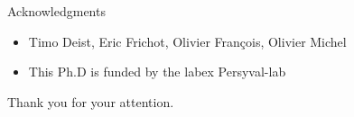 \documentclass{beamer}\usepackage[]{graphicx}\usepackage[]{color}
\begin{document}

\begin{frame}{Acknowledgments}
\begin{itemize}
  \item Timo Deist, Eric Frichot, Olivier Fran\c cois, Olivier Michel 
  \item This Ph.D is funded by the labex Persyval-lab
\end{itemize}

\begin{center}
\Huge \alert{Thank you for your attention.}
\end{center}



\end{frame}

% 
% 
% 
% 
% 
% 
% 
 


 
\end{document}
